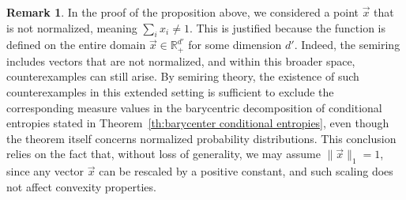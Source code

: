 \documentclass[aps,pra,11pt,onecolumn,nofootinbib,tightenlines]{revtex4-2}
\theoremstyle{definition}
\newtheorem{remark}[theorem]{Remark}
\begin{document}
\begin{remark}
In the proof of the proposition above, we considered a point $\vec{x}$ that is not normalized, meaning $\sum_i x_i \neq 1$. This is justified because the function is defined on the entire domain $\vec{x} \in \mathbb{R}_+^{d'}$ for some dimension $d'$. Indeed, the semiring includes vectors that are not normalized, and within this broader space, counterexamples can still arise. By semiring theory, the existence of such counterexamples in this extended setting is sufficient to exclude the corresponding measure values in the barycentric decomposition of conditional entropies stated in Theorem~\ref{th:barycenter conditional entropies}, even though the theorem itself concerns normalized probability distributions.
This conclusion relies on the fact that, without loss of generality, we may assume $\|\vec{x}\|_1 = 1$, since any vector $\vec{x}$ can be rescaled by a positive constant, and such scaling does not affect convexity properties.
\end{remark}
\end{document}
